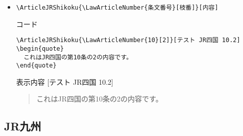 \documentclass[oneside,10pt,a4paper]{jsarticle}
\begin{document}
\begin{itemize}
\begin{itembox}[l]{表示内容}
        \begin{quote}
          これはJR四国の第10条の内容です。
        \end{quote}
      \end{itembox}
    \item \verb|\ArticleJRShikoku{\LawArticleNumber{条文番号}[枝番]}[内容]|
      \begin{itembox}[l]{コード}
        {\footnotesize\begin{verbatim}
\ArticleJRShikoku{\LawArticleNumber{10}[2]}[テスト JR四国 10.2]
\begin{quote}
  これはJR四国の第10条の2の内容です。
\end{quote}\end{verbatim}}
      \end{itembox}
      \begin{itembox}[l]{表示内容}
        [テスト JR四国 10.2]
        \begin{quote}
          これはJR四国の第10条の2の内容です。
        \end{quote}
      \end{itembox}
  \end{itemize}

  \newpage

  \subsection{JR九州}
\end{document}
